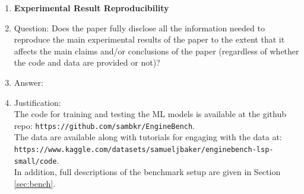 \documentclass{article}
\begin{document}
\begin{enumerate}
    \item {\bf Experimental Result Reproducibility}
    \item[] Question: Does the paper fully disclose all the information needed to reproduce the main experimental results of the paper to the extent that it affects the main claims and/or conclusions of the paper (regardless of whether the code and data are provided or not)?
    \item[] Answer: \answerYes{} %
    \item[] Justification: \\The code for training and testing the ML models is available at the github repo: \texttt{https://github.com/sambkr/EngineBench}.
    \\The data are available along with tutorials for engaging with the data at: \\ \texttt{https://www.kaggle.com/datasets/samueljbaker/enginebench-lsp-small/code}. \\In addition, full descriptions of the benchmark setup are given in Section \ref{sec:bench}.

\end{enumerate}
\end{document}
